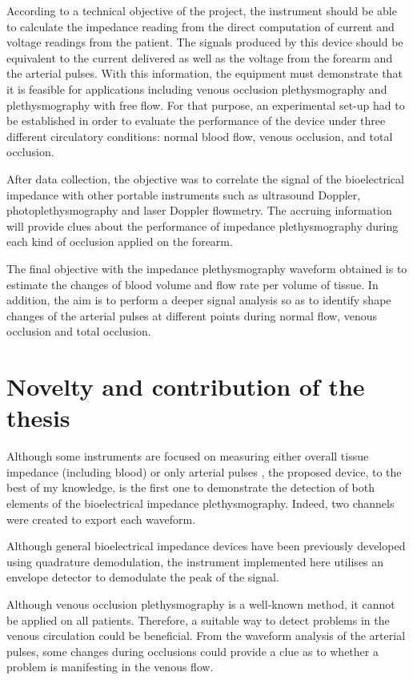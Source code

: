 According to a technical objective of the project, the instrument should be able to calculate the impedance reading from the direct computation of current and voltage readings from the patient. The signals produced by this device should be equivalent to the current delivered as well as the voltage from the forearm and the arterial pulses. With this information, the equipment must demonstrate that it is feasible for applications including venous occlusion plethysmography and plethysmography with free flow. For that purpose, an experimental set-up had to be established in order to evaluate the performance of the device under three different circulatory conditions: normal blood flow, venous occlusion, and total occlusion. 

After data collection, the objective was to correlate the signal of the bioelectrical impedance with other portable instruments such as ultrasound Doppler, photoplethysmography and laser Doppler flowmetry. The accruing information will provide clues about the performance of impedance plethysmography during each kind of occlusion applied on the forearm. 

The final objective with the impedance plethysmography waveform obtained is to estimate the changes of blood volume and flow rate per volume of tissue. In addition, the aim is to perform a  deeper signal analysis so as to identify shape changes of the arterial pulses at different points during normal flow, venous occlusion and total occlusion. 

\section{Novelty and contribution of the thesis}
Although some instruments are focused on measuring either overall tissue impedance (including blood) \cite{mohapatra1979measurement, costeloe1980continuous, yamakoshi1980limb} or only arterial pulses \cite{porter1985measurement, corciova2011peripheral, brown1975impedance, marks1985computer}, the proposed device, to the best of my knowledge, is the first one to demonstrate the detection of both elements of the bioelectrical impedance plethysmography. Indeed, two channels were created to export each waveform. 

Although general bioelectrical impedance devices have been previously developed using quadrature demodulation, the instrument implemented here utilises an envelope detector to demodulate the peak of the signal.

Although venous occlusion plethysmography is a well-known method, it cannot be applied on all patients. Therefore, a suitable way to detect problems in the venous circulation could be beneficial. From the waveform analysis of the arterial pulses, some changes during occlusions could provide a clue as to whether a problem is manifesting in the venous flow.

